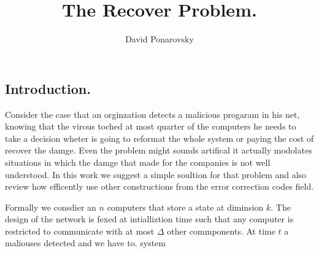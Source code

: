 

\title{ The Recover Problem.   } 
\author{David Ponarovsky}
\maketitle
{} 
\begin{multicols*}{2}

  \section{Introduction.} Consider the case that an orginzation detects a malicious progaram in his net, knowing that the virous toched at most quarter of the computers he needs to take a decision wheter is going to reformat the whole system or paying the cost of recover the damge. Even the problem might sounds artifical it actually modolates situations in which the damge that made for the companies is not well understood. In this work we suggest a simple soultion for that problem and also review how efficently use other constructions from the error correction codes field.

  Formally we consdier an $n$ computers that store a state at diminsion $k$. The design of the network is fexed at intialliztion time such that any computer is restricted to communicate with at most $\Delta$ other commponents. At time $t$ a maliouses detected and we have to.  system    

\end{multicols*}

